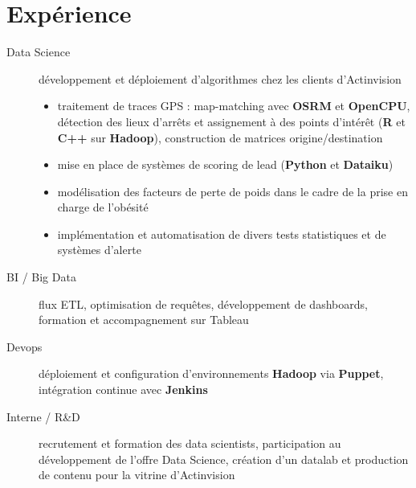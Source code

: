 \documentclass[a4paper]{deedy-resume} %
\begin{document}


\sectionspace
\sectionspace
\sectionspace
{}
\sectionspace
\sectionspace


\section{Expérience}


\begin{description}
\item[Data Science] développement et déploiement d'algorithmes chez les clients d'Actinvision
\begin{itemize}
\item traitement de traces GPS : map-matching avec \textbf{OSRM} et \textbf{OpenCPU}, détection des lieux d'arrêts et assignement à des points d'intérêt (\textbf{R} et \textbf{C++} sur \textbf{Hadoop}), construction de matrices origine/destination
\item mise en place de systèmes de scoring de lead (\textbf{Python} et \textbf{Dataiku})
\item modélisation des facteurs de perte de poids dans le cadre de la prise en charge de l'obésité
\item implémentation et automatisation de divers tests statistiques et de systèmes d'alerte
\end{itemize}
\item[BI / Big Data] flux ETL, optimisation de requêtes, développement de dashboards, formation et accompagnement sur Tableau
\item[Devops] déploiement et configuration d'environnements \textbf{Hadoop} via \textbf{Puppet}, intégration continue avec \textbf{Jenkins}
\item[Interne / R\&D] recrutement et formation des data scientists, participation au développement de l'offre Data Science, création d'un datalab et production de contenu pour la vitrine d'Actinvision
\end{description}
\end{document}
